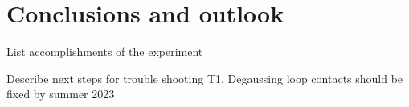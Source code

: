 
\chapter{Conclusions and outlook}


List accomplishments of the experiment

Describe next steps for trouble shooting T1. Degaussing loop contacts should be fixed by summer 2023
